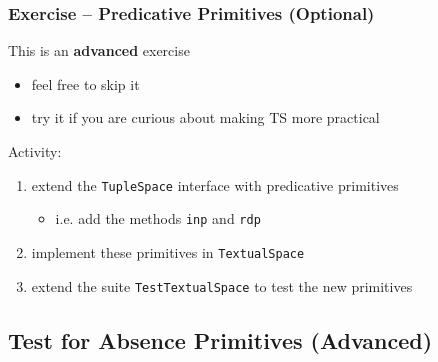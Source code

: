 \documentclass[presentation]{beamer}\mode<presentation>{\usetheme{AMSCesenaPurpleAndGold}}
\begin{document}
\begin{frame}[allowframebreaks]
	\frametitle{Exercise \currentExercise{} -- Predicative Primitives (Optional)}

	\begin{alertblock}{This is an \textbf{advanced} exercise}
		\begin{itemize}
			\item feel free to skip it
			\item try it if you are curious about making TS more practical
		\end{itemize}
	\end{alertblock}

	\bigskip

	Activity:
	\medskip
	\begin{enumerate}
		\item extend the \texttt{TupleSpace} interface with \alert{predicative} primitives
		\begin{itemize}
			\item i.e. add the methods \texttt{inp} and \texttt{rdp}
		\end{itemize}

		\medskip

		\item implement these primitives in \texttt{TextualSpace}

		\medskip

		\item extend the suite \texttt{TestTextualSpace} to test the new primitives

	\end{enumerate}

\end{frame}

\startExercise

\subsection{Test for Absence Primitives (Advanced)}
\end{document}
